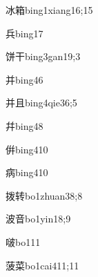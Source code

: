 \begin{verbete}{冰箱}{bing1xiang1}{6;15}
\end{verbete}

\begin{verbete}{兵}{bing1}{7}
\end{verbete}

\begin{verbete}{饼干}{bing3gan1}{9;3}
\end{verbete}

\begin{verbete}{并}{bing4}{6}
\end{verbete}

\begin{verbete}{并且}{bing4qie3}{6;5}
\end{verbete}

\begin{verbete}{幷}{bing4}{8}
\end{verbete}

\begin{verbete}{倂}{bing4}{10}
\end{verbete}

\begin{verbete}{病}{bing4}{10}
\end{verbete}

\begin{verbete}{拨转}{bo1zhuan3}{8;8}
\end{verbete}

\begin{verbete}{波音}{bo1yin1}{8;9}
\end{verbete}

\begin{verbete}{啵}{bo1}{11}
\end{verbete}

\begin{verbete}{菠菜}{bo1cai4}{11;11}
\end{verbete}

